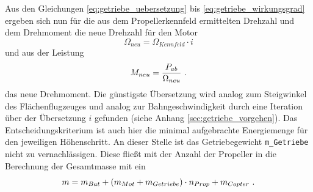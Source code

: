 Aus den Gleichungen \eqref{eq:getriebe_uebersetzung} bis \eqref{eq:getriebe_wirkungsgrad} ergeben sich nun für die aus dem Propellerkennfeld ermittelten Drehzahl und dem Drehmoment die neue Drehzahl für den Motor
\begin{equation}
	\Omega_{neu} = \Omega_{Kennfeld}\cdot i
\end{equation}
und aus der Leistung
\begin{equation}
	M_{neu} = \frac{P_{ab}}{\Omega_{neu}} ~\text{.}
\end{equation}
das neue Drehmoment.
Die günstigste Übersetzung wird analog zum Steigwinkel des Flächenflugzeuges und analog zur Bahngeschwindigkeit durch eine Iteration über der Übersetzung \ensuremath{i} gefunden (siehe Anhang \ref{sec:getriebe_vorgehen}). Das Entscheidungskriterium ist auch hier die minimal aufgebrachte Energiemenge für den jeweiligen Höhenschritt. An dieser Stelle ist das Getriebegewicht \texttt{m\_Getriebe} nicht zu vernachlässigen. Diese fließt mit der Anzahl der Propeller in die Berechnung der Gesamtmasse mit ein
\begin{equation}
	m = m_{Bat} + (m_{Mot} + m_{Getriebe})\cdot n_{Prop} + m_{Copter} ~\text{.}
\end{equation}


